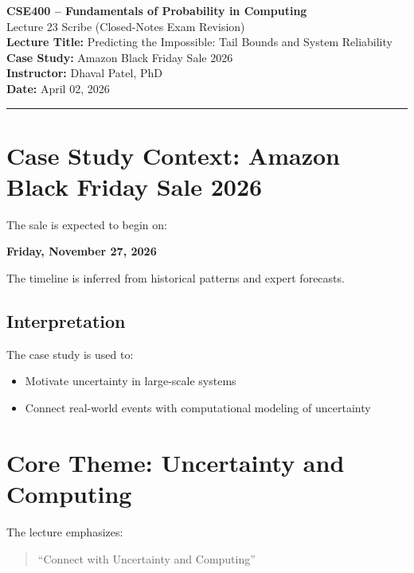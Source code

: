 \documentclass[12pt]{article}
\begin{document}
\begin{center}
{\Large \textbf{CSE400 -- Fundamentals of Probability in Computing}}\\[0.2cm]
{\large Lecture 23 Scribe (Closed-Notes Exam Revision)}\\[0.3cm]

\textbf{Lecture Title:} Predicting the Impossible: Tail Bounds and System Reliability\\
\textbf{Case Study:} Amazon Black Friday Sale 2026\\
\textbf{Instructor:} Dhaval Patel, PhD\\
\textbf{Date:} April 02, 2026
\end{center}

\hrule
\vspace{0.4cm}

\section{Case Study Context: Amazon Black Friday Sale 2026}

The sale is expected to begin on:

\begin{center}
\textbf{Friday, November 27, 2026}
\end{center}

The timeline is inferred from historical patterns and expert forecasts.

\subsection{Interpretation}

The case study is used to:

\begin{itemize}
\item Motivate uncertainty in large-scale systems
\item Connect real-world events with computational modeling of uncertainty
\end{itemize}

\section{Core Theme: Uncertainty and Computing}

The lecture emphasizes:

\begin{quote}
``Connect with Uncertainty and Computing''
\end{quote}
\end{document}
